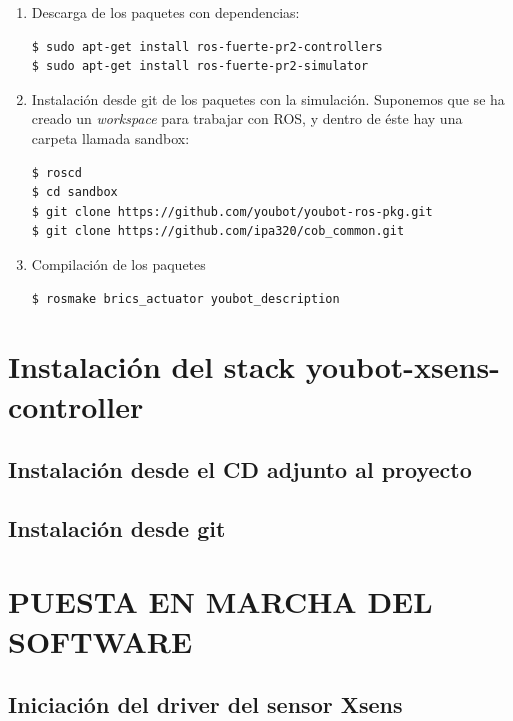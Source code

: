 \documentclass[12pt, a4paper]{report}
\begin{document}
\begin{enumerate}
\item Descarga de los paquetes con dependencias:

\begin{verbatim}
$ sudo apt-get install ros-fuerte-pr2-controllers
$ sudo apt-get install ros-fuerte-pr2-simulator
\end{verbatim}

\item Instalación desde git de los paquetes con la simulación. Suponemos que se ha creado un \textit{workspace} para trabajar con ROS, y dentro de éste hay una carpeta llamada sandbox:

\begin{verbatim}
$ roscd
$ cd sandbox
$ git clone https://github.com/youbot/youbot-ros-pkg.git
$ git clone https://github.com/ipa320/cob_common.git
\end{verbatim}

\item Compilación de los paquetes

\begin{verbatim}
$ rosmake brics_actuator youbot_description
\end{verbatim}

\end{enumerate}



\section{Instalación del stack youbot-xsens-controller}



\subsection{Instalación desde el CD adjunto al proyecto}

\subsection{Instalación desde git}

\section{PUESTA EN MARCHA DEL SOFTWARE}

\subsection{Iniciación del driver del sensor Xsens}
\end{document}
